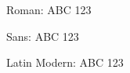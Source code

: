 \documentclass{article}
\begin{document}
Roman: { ABC 123}

Sans: { ABC 123}

Latin Modern: { ABC 123}
\end{document}

